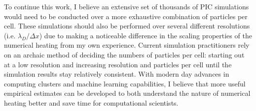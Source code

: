 To continue this work, I believe an extensive set of thousands of \gls{PIC} simulations would need to be conducted over a more exhaustive combination of particles per cell. These simulations should also be performed over several different resolutions (i.e. $\lambda_D / \Delta x$) due to making a noticeable difference in the scaling properties of the numerical heating from my own experience. Current simulation practitioners rely on an archaic method of deciding the numbers of particles per cell: starting out at a low resolution and increasing resolution and particles per cell until the simulation results stay relatively consistent. With modern day advances in computing clusters and machine learning capabilities, I believe that more useful empirical estimates can be developed to both understand the nature of numerical heating better and save time for computational scientists.
